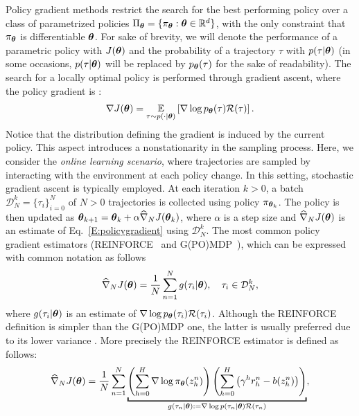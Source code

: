 Policy gradient methods restrict the search for the best performing policy over a class of parametrized policies $\Pi_{\vtheta}=\{\pol: \vtheta \in \realspace^d\}$, with the only constraint that $\pol$ is differentiable \wrt $\vtheta$. For sake of brevity, we will denote the performance of a parametric policy with $J(\vtheta)$ and the probability of a trajectory $\tau$ with $p(\tau|\vtheta)$ (in some occasions, $p(\tau|\vtheta)$ will be replaced by $p_{\vtheta}(\tau)$ for the sake of readability).
The search for a locally optimal policy is performed through gradient ascent, where the policy gradient
is \citep{sutton2000policy, peters2008reinforcement}:
\begin{align} \label{E:policygradient}
	\gradJ{\vtheta} = \EVV[\tau \sim p(\cdot|\vtheta)]{\score{\vtheta}{\tau}\Reward(\tau)}.
\end{align}
Notice that the distribution defining the gradient is induced by the current policy. This aspect introduces a nonstationarity in the sampling process.
Here, we consider the \emph{online learning scenario}, where trajectories are sampled by interacting with the environment at each policy change. 
In this setting, stochastic gradient ascent is typically employed.
At each iteration $k >0$, a batch $\mathcal{D}_N^k = \{\tau_i\}_{i=0}^N$ of $N>0$ trajectories is collected using policy $\pi_{\vtheta_k}$.
The policy is then updated as $\vtheta_{k+1}  = \vtheta_k + \alpha\gradApp{\vtheta_k}{N}$, where $\alpha$ is a step size and $\gradApp{\vtheta}{N}$ is an estimate of Eq.~\eqref{E:policygradient} using $\mathcal{D}_N^k$. The most common policy gradient estimators (\eg REINFORCE~\citep{williams1992simple} and G(PO)MDP~\citep{baxter2001infinite}), which can be expressed with common notation as follows
\begin{align} \label{E:policygradient.estimate}
	\gradApp{\vtheta}{N} = \frac{1}{N}\sum_{n=1}^{N} g(\tau_i|\vtheta), \quad \tau_i \in \mathcal{D}_N^k,
\end{align}
where $g(\tau_i|\vtheta)$ is an estimate of $\score{\vtheta}{\tau_i}\Reward(\tau_i)$.
Although the REINFORCE definition is simpler than the G(PO)MDP one, the latter is usually preferred due to its lower variance \citep{zhao2011analysis}. More precisely the REINFORCE estimator is defined as follows:
\begin{align*}
\gradApp{\vtheta}{N} = \frac{1}{N}\sum_{n=1}^{N}
\underbracket{
	\left(\sum_{h=0}^{H}\nabla \log \pol(z_h^n) \right)\left(\sum_{h=0}^{H}\left(\gamma^h 
	r_h^n
	- b(z_h^n)\right)\right)
}_{g(\tau_n|\vtheta):=\nabla \log p(\tau_n|\vtheta)\Reward(\tau_n)}
,
\end{align*}
